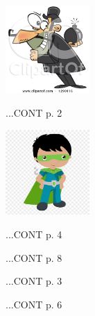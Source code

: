 \documentclass{article}
\begin{document}
\maketitle

\begin{floatingfigure}[l]{0.26\textwidth}
\includegraphics[width=0.24\textwidth]{images/img-01-04-01}
\end{floatingfigure}
\lipsum[1-2][1-20]
...CONT p. 2
\closearticle

\begin{floatingfigure}[r]{0.26\textwidth}
\includegraphics[width=0.24\textwidth]{images/img-01-04-02}
\end{floatingfigure}
\lipsum[3-4][2-24]
...CONT p. 4
\closearticle


\begin{multicols}{3}
\lipsum[6][2-3]
...CONT p. 8

\lipsum[7-8][1-8]
...CONT p. 3

\lipsum[9-10][1]
...CONT p. 6
\end{multicols}
\end{document}
